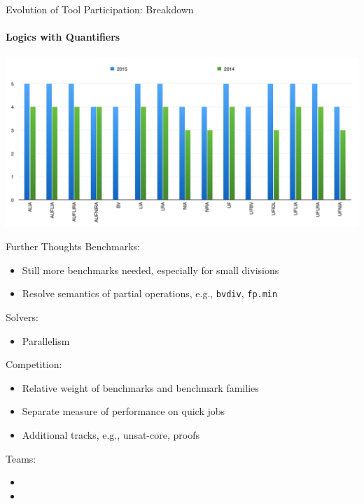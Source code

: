 \documentclass{beamer}
\begin{document}
\begin{frame}{Evolution of Tool Participation: Breakdown}
\framesubtitle{Logics with Quantifiers}

\begin{center}
\includegraphics[width=\textwidth]{solvers-logics-with-quantifiers}
\end{center}


\end{frame}


\begin{frame}{Further Thoughts}
  Benchmarks:
  \begin{itemize}
  \item Still more benchmarks needed, especially for small divisions
  \item Resolve semantics of partial operations, e.g., {\tt bvdiv},
    {\tt fp.min}
  \end{itemize}

  \medskip

  Solvers:
  \begin{itemize}
  \item Parallelism
  \end{itemize}

  \medskip

  Competition:
  \begin{itemize}
  \item Relative weight of benchmarks and benchmark families
  \item Separate measure of performance on quick jobs
  \item Additional tracks, e.g., unsat-core, proofs
  \end{itemize}

  \medskip

  Teams:
  \begin{itemize}
  \item {}
  \item {}
  \end{itemize}
\end{frame}

\end{document}
